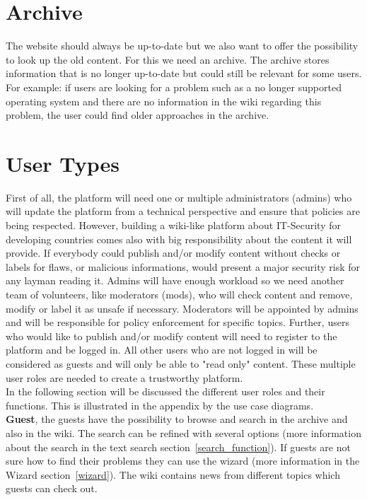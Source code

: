 \section{Archive}
\label{archive}
The website should always be up-to-date but we also want to offer the possibility to look up the old content.
For this we need an archive.
The archive stores information  that is no longer up-to-date but could still be relevant for some users. 
For example: if users are looking for a problem such as a no longer supported operating system and there are no information in the wiki regarding this problem, the user could find older approaches in the archive. 

\section{User Types} 
\label{user_types}
First of all, the platform will need one or multiple administrators (admins) who will update the platform from a technical perspective and ensure that policies are being respected. 
However, building a wiki-like platform about IT-Security for developing countries comes also with big responsibility about the content it will provide. 
If everybody could publish and/or modify content without checks or labels for flaws, or malicious informations, would present a major security risk for any layman reading it. 
Admins will have enough workload so we need another team of volunteers, like moderators (mods), who will check content and remove, modify or label it as unsafe if necessary. 
Moderators will be appointed by admins and will be responsible for policy enforcement for specific topics. 
Further, users who would like to publish and/or modify content will need to register to the platform and be logged in. 
All other users who are not logged in will be considered as guests and will only be able to "read only" content. 
These multiple user roles are needed to create a trustworthy platform. 
\\
In the following section will be discussed the different user roles and their functions. 
This is illustrated in the appendix by the use case diagrams. 
\\
\textbf{Guest}, the guests have the possibility to browse and search in the archive and also in the wiki. 
The search can be refined with several options (more information about the search in the text search section~\ref{search_function}). 
If guests are not sure how to find their problems they can use the wizard (more information in the Wizard section~\ref{wizard}). 
The wiki contains news from different topics which guests can check out.

